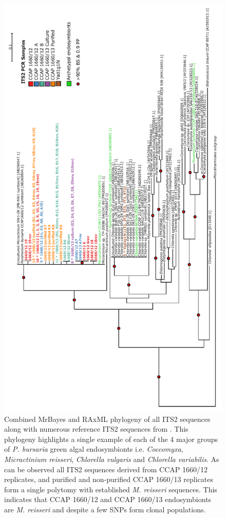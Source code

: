 \begin{figure}
    \includegraphics[angle=90,width=\textwidth]{its_phylo.pdf}
    \caption[ITS2 Phylogeny]{Combined MrBayes and RAxML phylogeny of all ITS2 sequences
    along with numerous reference ITS2 sequences from \citep{Hoshina2010,Hoshina2013}.
    This phylogeny highlights a single example of each of the 4 major groups of 
    \textit{P. bursaria} green algal endosymbionts i.e. \textit{Coccomyxa}, \textit{Micractinium reisseri},
    \textit{Chlorella vulgaris} and \textit{Chlorella variabilis}.  As can be observed all
    ITS2 sequences derived from CCAP 1660/12 replicates, and purified and non-purified CCAP 1660/13
    replicates form a single polytomy with established \textit{M. reisseri} sequences.  This indicates 
    that CCAP 1660/12 and CCAP 1660/13 endosymbionts are \textit{M. reisseri} and despite a few SNPs
form clonal populations.}
    \label{fig:its2_phylo}
\end{figure}

